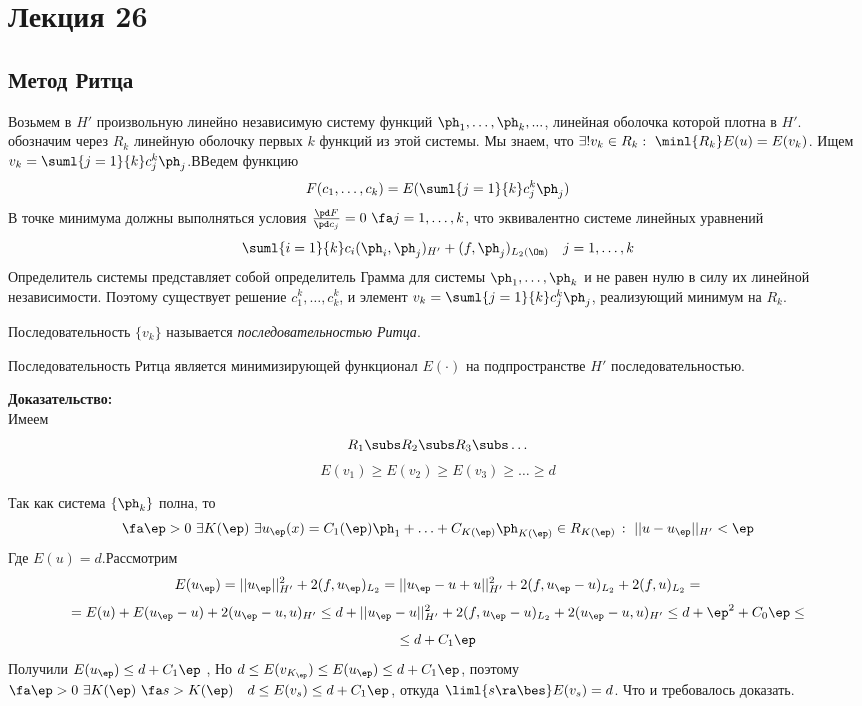 \documentclass[a4paper,draft]{article}
\begin{document}

\section{Лекция 26}
\subsection {Метод Ритца}
Возьмем в $H'$  произвольную линейно независимую систему функций
$\ph_1,\ldots,\ph_k,...$, линейная оболочка которой плотна в
$H'$. обозначим через $R_k$ линейную оболочку первых $k$ функций
из этой системы. Мы знаем, что $\exists! v_k \in R_k:\ \minl{R_k} E(u)=E(v_k)$.
Ищем $v_k=\suml{j=1}{k} c_j^k \ph_j$.ВВедем функцию
$$
F(c_1,\ldots,c_k)=E(\suml{j=1}{k} c_j^k \ph_j)
$$
В точке минимума должны выполняться условия $\frac{\pd
F}{\pd c_j}=0\ \fa j=1,\ldots,k$, что эквивалентно
системе линейных уравнений
$$
\suml{i=1}{k} c_i
(\ph_i,\ph_j)_{H'}+(f,\ph_j)_{L_2(\Om)}\quad j=1,\ldots,k
$$
Определитель системы представляет собой определитель Грамма для
системы $\ph_1,\ldots,\ph_k$ и не равен нулю в силу их линейной
независимости. Поэтому существует решение $c_1^k,\ldots,c^k_k$, и
элемент $v_k=\suml{j=1}{k} c_j^k \ph_j$, реализующий минимум на
$R_k$.

Последовательность $\{v_k\}$ называется \emph{последовательностью
Ритца}.
\begin{theorem}
Последовательность Ритца является минимизирующей функционал
$E(\cdot)$ на подпространстве $H'$ последовательностью.
\end{theorem}


\noindent\textbf{Доказательство:}\\
Имеем
$$
R_1\subs R_2\subs R_3\subs \ldots
$$
$$
E(v_1)\ge E(v_2)\ge E(v_3) \ge \ldots \ge d
$$

Так как система $\{\ph_k\}$ полна, то
$$
\fa\ep>0\  \exists K(\ep)\  \exists
u_\ep(x)=C_1(\ep)\ph_1+\ldots+C_{K(\ep)}\ph_{K(\ep)}
\in R_{K(\ep)}\,:\ ||u-u_\ep||_{H'}<\ep
$$
Где $E(u)=d$.Рассмотрим
$$
E(u_\ep)=||u_\ep||^2_{H'}+2
(f,u_\ep)_{L_2}=||u_\ep-u+u||^2_{H'}+2
(f,u_\ep-u)_{L_2}+2(f,u)_{L_2}=
$$
$$
=E(u)+E(u_\ep-u)+2(u_\ep-u,u)_{H'} \le d+
||u_\ep-u||^2_{H'}+2(f,u_\ep-u)_{L_2}+2(u_\ep-u,u)_{H'}\le
d+\ep^2+C_0\ep \le
$$
$$
\le d+C_1\ep
$$
Получили $E(u_\ep)\le d+C_1\ep$ , Но $d\le
E(v_{K_\ep})\le E(u_\ep) \le d+C_1\ep$,
поэтому $\fa\ep>0\  \exists K(\ep)\ \fa
s>K(\ep) \quad d\le E(v_s)\le d+C_1 \ep$,
 откуда $\liml{s\ra\bes} E(v_s) =d$. Что и требовалось
 доказать.\\
\end{document}
